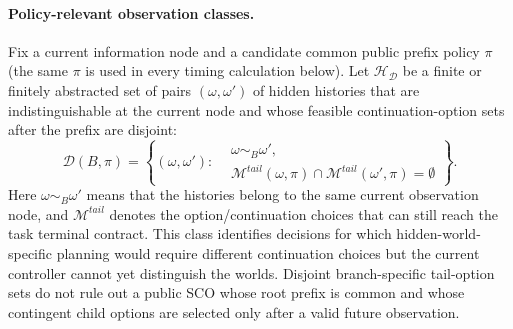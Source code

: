 \documentclass[letterpaper]{article} %
\begin{document}
\paragraph{Policy-relevant observation classes.}
Fix a current information node and a candidate common public prefix policy $\pi$ (the same $\pi$ is used in every timing calculation below). Let $\mathcal H_{\mathcal D}$ be a finite or finitely abstracted set of pairs $(\omega,\omega')$ of hidden histories that are indistinguishable at the current node and whose feasible continuation-option sets after the prefix are disjoint:
\begin{equation}
\mathcal D(B,\pi)=
\left\{(\omega,\omega'):
\begin{aligned}
&\omega\sim_B\omega',\\
&\mathcal M^{tail}(\omega,\pi)
\cap\mathcal M^{tail}(\omega',\pi)=\emptyset
\end{aligned}\right\}.
\label{eq:policy-relevant-pairs}
\end{equation}
Here $\omega\sim_B\omega'$ means that the histories belong to the same current observation node, and $\mathcal M^{tail}$ denotes the option/continuation choices that can still reach the task terminal contract. This class identifies decisions for which hidden-world-specific planning would require different continuation choices but the current controller cannot yet distinguish the worlds. Disjoint branch-specific tail-option sets do not rule out a public SCO whose root prefix is common and whose contingent child options are selected only after a valid future observation.
\end{document}
